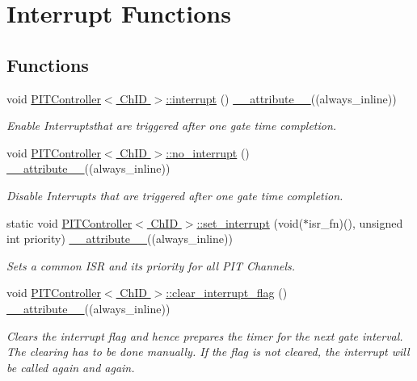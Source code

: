 \hypertarget{group__Interrupt}{}\section{\textquotesingle{}\textquotesingle{}Interrupt Functions\textquotesingle{}\textquotesingle{}}
\label{group__Interrupt}
\subsection*{Functions}
\begin{DoxyCompactItemize}
\item 
void \hyperlink{group__Interrupt_gaf1a21e0b3f9a57e247aa40c457e15ee3}{P\+I\+T\+Controller$<$ Ch\+I\+D $>$\+::interrupt} () \hyperlink{utilities_8hpp_a103d5b3998e0dd804213c8f30a094f4d}{\+\_\+\+\_\+attribute\+\_\+\+\_\+}((always\+\_\+inline))
\begin{DoxyCompactList}\small\item\em Enable Interruptsthat are triggered after one gate time completion. \end{DoxyCompactList}\item 
void \hyperlink{group__Interrupt_ga6e36c84f319e52e5a14ca20f299b64b5}{P\+I\+T\+Controller$<$ Ch\+I\+D $>$\+::no\+\_\+interrupt} () \hyperlink{utilities_8hpp_a103d5b3998e0dd804213c8f30a094f4d}{\+\_\+\+\_\+attribute\+\_\+\+\_\+}((always\+\_\+inline))
\begin{DoxyCompactList}\small\item\em Disable Interrupts that are triggered after one gate time completion. \end{DoxyCompactList}\item 
static void \hyperlink{group__Interrupt_gaa94b6dc081d453c8dda54c3ade4b3d94}{P\+I\+T\+Controller$<$ Ch\+I\+D $>$\+::set\+\_\+interrupt} (void($\ast$isr\+\_\+fn)(), unsigned int priority) \hyperlink{utilities_8hpp_a103d5b3998e0dd804213c8f30a094f4d}{\+\_\+\+\_\+attribute\+\_\+\+\_\+}((always\+\_\+inline))
\begin{DoxyCompactList}\small\item\em Sets a common I\+SR and its priority for all P\+IT Channels. \end{DoxyCompactList}\item 
void \hyperlink{group__Interrupt_gae3f9c981e88cced34153234475de5646}{P\+I\+T\+Controller$<$ Ch\+I\+D $>$\+::clear\+\_\+interrupt\+\_\+flag} () \hyperlink{utilities_8hpp_a103d5b3998e0dd804213c8f30a094f4d}{\+\_\+\+\_\+attribute\+\_\+\+\_\+}((always\+\_\+inline))
\begin{DoxyCompactList}\small\item\em Clears the interrupt flag and hence prepares the timer for the next gate interval. The clearing has to be done manually. If the flag is not cleared, the interrupt will be called again and again. \end{DoxyCompactList}\end{DoxyCompactItemize}


